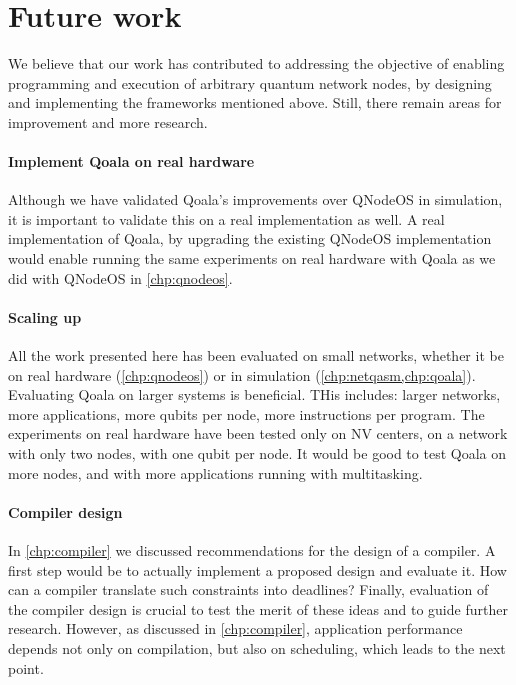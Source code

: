 \section{Future work}
We believe that our work has contributed to addressing the objective of enabling programming and execution of arbitrary quantum network nodes, by designing and implementing the frameworks mentioned above.
Still, there remain areas for improvement and more research.

\paragraph{Implement Qoala on real hardware}
Although we have validated Qoala's improvements over QNodeOS in simulation, it is important to validate this on a real implementation as well.
A real implementation of Qoala, by upgrading the existing QNodeOS implementation would enable running the same experiments on real hardware with Qoala as we did with QNodeOS in \cref{chp:qnodeos}.


\paragraph{Scaling up}
All the work presented here has been evaluated on small networks, whether it be on real hardware (\cref{chp:qnodeos}) or in simulation (\cref{chp:netqasm,chp:qoala}).
Evaluating Qoala on larger systems is beneficial.
THis includes: larger networks, more applications, more qubits per node, more instructions per program.
The experiments on real hardware have been tested only on NV centers, on a network with only two nodes, with one qubit per node.
It would be good to test Qoala on more nodes, and with more applications running with multitasking.

\paragraph{Compiler design}
In \cref{chp:compiler} we discussed recommendations for the design of a compiler.
A first step would be to actually implement a proposed design and evaluate it.
How can a compiler translate such constraints into deadlines?
Finally, evaluation of the compiler design is crucial to test the merit of these ideas and to guide further research.
However, as discussed in \cref{chp:compiler}, application performance depends not only on compilation, but also on scheduling, which leads to the next point.

